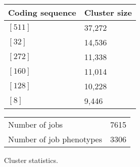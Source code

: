 \documentclass{jhps}
\begin{document}
\noindent\begin{minipage}{\textwidth}

\begingroup
  \centering
  \begin{tabular}{ll}
    Coding sequence & Cluster size \\
    \hline
    $[511]$ & 37,272 \\
    $[32]$  & 14,536 \\
    $[272]$ & 11,338 \\
    $[160]$ & 11,014 \\
    $[128]$ & 10,228 \\
    $[8]$   & 9,446  \\
  \end{tabular}
  \label{tab:bin:largest_clusters}
\endgroup

\medskip

\captionsetup{type=table}
\begingroup
  \begin{subtable}{\textwidth}
  \centering
  \begin{tabular}{lr}
    Number of jobs & 7615 \\
    Number of job phenotypes & 3306 \\
  \end{tabular}
  \caption{Cluster statistics.}
  \label{tab:bin_all:stats}
  \end{subtable}
\endgroup

\medskip


\end{minipage}
\end{document}
